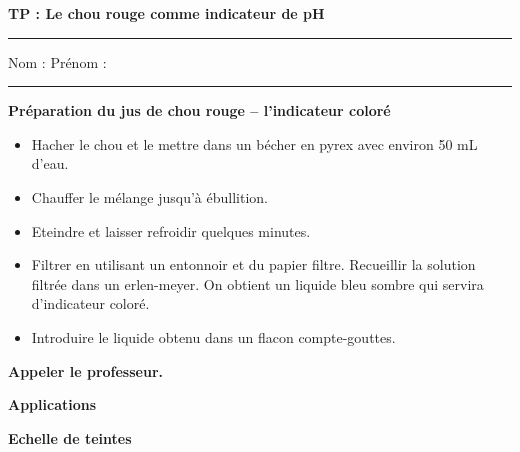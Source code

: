 \documentclass[11pt,a4paper]{article}
\begin{document}
\begin{center}
  {\LARGE\textbf{TP : Le chou rouge comme indicateur de pH}}
\end{center}

\hrule
\vspace{3mm}

\noindent Nom : \dotfill \quad Prénom : \dotfill

\vspace{3mm}
\hrule
\vspace{5mm}


\textbf{\large Préparation du jus de chou rouge -- l'indicateur coloré}

\vspace{3mm}

\begin{itemize}
  \item Hacher le chou et le mettre dans un bécher en pyrex avec environ 50 mL d'eau.
  \item Chauffer le mélange jusqu'à ébullition.
  \item Eteindre et laisser refroidir quelques minutes.
  \item Filtrer en utilisant un entonnoir et du papier filtre. Recueillir la solution filtrée dans un erlen-meyer. On obtient un liquide bleu sombre qui servira d'indicateur coloré.
  \item Introduire le liquide obtenu dans un flacon compte-gouttes.
\end{itemize}

\begin{tcolorbox}[colback=orange!10!white, colframe=orange!80!black]
\textbf{Appeler le professeur.}
\end{tcolorbox}

\vspace{5mm}


\textbf{\large Applications}

\vspace{5mm}

\textbf{Echelle de teintes}
\end{document}

